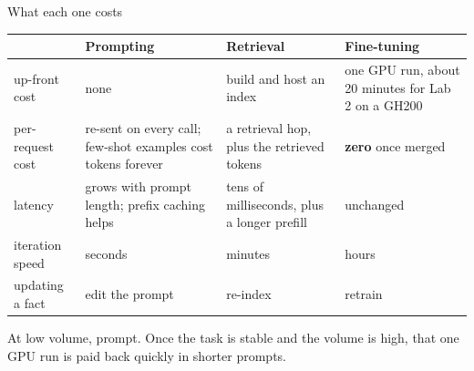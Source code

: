 \documentclass[aspectratio=169,10pt]{beamer}
\begin{document}
\iffalse
\begin{frame}[shrink=16]{What each one costs}
  \centering
  \small
  \begin{tabular}{@{}L{2.0cm} L{2.9cm} L{2.9cm} L{2.9cm}@{}}
    \toprule
    & \textbf{Prompting} & \textbf{Retrieval} & \textbf{Fine-tuning}\\
    \midrule
    up-front cost & none & build and host an index & one GPU run, about 20
      minutes for Lab 2 on a GH200\\ \addlinespace[0.2em]
    per-request cost & re-sent on every call; few-shot examples cost tokens
      forever & a retrieval hop, plus the retrieved tokens &
      \textbf{zero} once merged\\ \addlinespace[0.2em]
    latency & grows with prompt length; prefix caching helps &
      tens of milliseconds, plus a longer prefill & unchanged\\ \addlinespace[0.2em]
    iteration speed & seconds & minutes & hours\\ \addlinespace[0.2em]
    updating a fact & edit the prompt & re-index & retrain\\
    \bottomrule
  \end{tabular}

  \vspace{0.5em}
  \raggedright
  At low volume, prompt. Once the task is stable and the volume is high, that
  one GPU run is paid back quickly in shorter prompts.
\end{frame}
\end{document}
